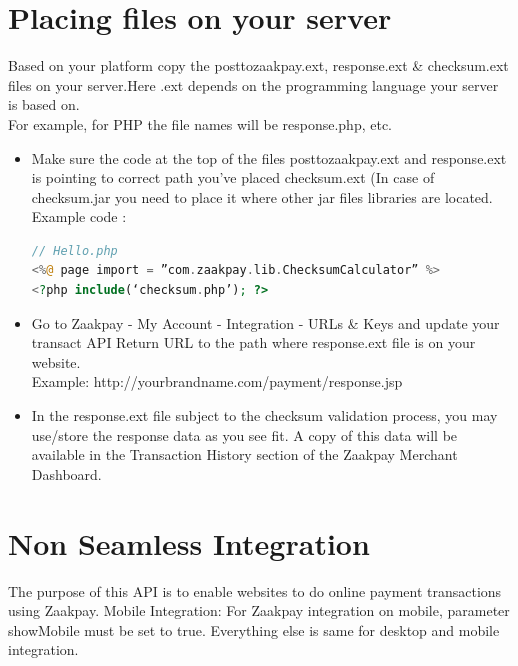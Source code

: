 \documentclass{article}
\begin{document}
\newpage
\section{Placing files on your server}
Based on your platform copy the posttozaakpay.ext, response.ext \& checksum.ext files on your server.Here .ext depends on the programming language your server is based on. 
\\
For example, for PHP the file names will be response.php, etc.
\begin{itemize}
\item Make sure the code at the top of the files posttozaakpay.ext and response.ext is pointing to correct path you’ve placed checksum.ext (In case of checksum.jar you need to place it where other jar files libraries are located.
\\ Example code :
\begin{lstlisting}[language=PHP]
// Hello.php
<%@ page import = ”com.zaakpay.lib.ChecksumCalculator” %>
<?php include(‘checksum.php’); ?>
\end{lstlisting}
\item Go to Zaakpay - My Account - Integration - URLs \& Keys and update your transact API Return URL to the path where response.ext file is on your website. 
\\Example:
http://yourbrandname.com/payment/response.jsp
\item In the response.ext file subject to the checksum validation process, you may use/store the response data as you see fit. A copy of this data will be available in the Transaction History section of the Zaakpay Merchant Dashboard.
\end{itemize}



\newpage

\section{Non Seamless Integration}
The purpose of this API is to enable websites to do online payment transactions using Zaakpay. Mobile Integration: For Zaakpay integration on mobile, parameter showMobile must be set to true. Everything else is same for desktop and mobile integration. 
\end{document}
